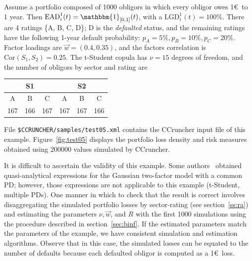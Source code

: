\documentclass[11pt,fleqn]{book} %
\begin{document}
\begin{example}
	\label{ex:test05}
	Assume a portfolio composed of \num{1000} obligors in which every obligor 
	owes 1\euro\ to 1 year. Then $\text{EAD}_i^1(t) = \mathbbm{1}_{[0,1]}(t)$, 
	with a $\text{LGD}_i^1(t)=100\%$. There are 4 ratings \{A, B, C, D\}; D is 
	the \emph{defaulted} status, and the remaining ratings have the following 
	1-year default probability: $p_A = 5\%, p_B = 10\%, p_C = 20\%$. Factor 
	loadings are $\vec{w} = (0.4, 0.35)$, and the factors correlation is 
	$\text{Cor}(S_1,S_2) = 0.25$. The t-Student copula has $\nu=15$ degrees
	of freedom, and the number of obligors by sector and rating are

	\hspace*{1cm}
	\begin{tabular}{|c|c|c||c|c|c|}
		\hline
		\multicolumn{3}{|c||}{S1} & \multicolumn{3}{|c|}{S2} \\
		\hline
		A & B & C & A & B & C \\
		\hline
		167 & 166 & 167 & 167 & 167 & 166 \\
		\hline
	\end{tabular}

	File \texttt{\$CCRUNCHER/samples/test05.xml} contains the CCruncher input
	file of this example. Figure~\ref{fig:test05} displays the portfolio
	loss density and risk measures obtained using \num{200000} values 
	simulated by CCruncher.

	It is difficult to ascertain the validity of this example. Some 
	authors~\cite{cespedes:2002} obtained quasi-analytical expressions for 
	the Gaussian two-factor model with a common PD; however, those expressions 
	are not applicable to this example (t-Student, multiple PDs). One manner in 
	which to check that the result is correct involves disaggregating the 
	simulated portfolio losses by sector-rating (see section~\ref{ss:ra}) and 
	estimating the parameters $\nu, \vec{w}$, and $R$ with the first \num{1000} 
	simulations using the procedure described in section~\ref{sec:binf}. 
	If the estimated parameters match the parameters of the example, we have
	consistent simulation and estimation algorithms. Observe that in 
	this case, the simulated losses can be equated to the number of defaults 
	because each defaulted obligor is computed as a 1\euro\ loss.
\end{example}
\end{document}
